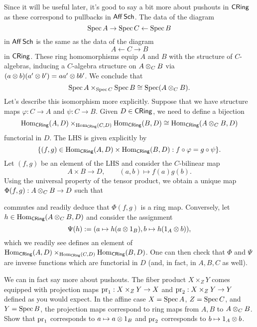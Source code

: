 \documentclass[11pt]{article}
\renewcommand{\phi}{\varphi}
\begin{document}
Since it will be useful later, it's good to say a bit more about pushouts in $\operatorname{\mathsf{CRing}}$ as these correspond to pullbacks in $\operatorname{\mathsf{Aff}}\operatorname{\mathsf{Sch}}$. The data of the diagram 
$$\operatorname{Spec} A\rightarrow\operatorname{Spec} C\leftarrow\operatorname{Spec} B$$
in $\operatorname{\mathsf{Aff}}\operatorname{\mathsf{Sch}}$ is the same as the data of the diagram
$$A\leftarrow C\rightarrow B$$
in $\operatorname{\mathsf{CRing}}$. These ring homomorphisms equip $A$ and $B$ with the structure of $C$-algebras, inducing a $C$-algebra structure on $A\otimes_CB$ via $(a\otimes b)(a'\otimes b')=aa'\otimes bb'$. We conclude that
$$\operatorname{Spec} A\times_{\operatorname{Spec} C}\operatorname{Spec} B\cong\operatorname{Spec}(A\otimes_CB).$$
Let's describe this isomorphism more explicitly. Suppose that we have structure maps $\phi: C\to A$ and $\psi: C\to B$. Given $D\in\operatorname{\mathsf{CRing}}$, we need to define a bijection
$$\operatorname{Hom}_{\operatorname{\mathsf{CRing}}}(A,D)\times_{\operatorname{Hom}_{\operatorname{\mathsf{CRing}}}(C,D)}\operatorname{Hom}_{\operatorname{\mathsf{CRing}}}(B,D)\cong\operatorname{Hom}_{\operatorname{\mathsf{CRing}}}(A\otimes_CB,D)$$
functorial in $D$. The LHS is given explicitly by 
$$\{(f,g)\in\Hom_{\CRing}(A,D)\times\Hom_{\CRing}(B,D) : f\circ\phi=g\circ\psi\}.$$
Let $(f,g)$ be an element of the LHS and consider the $C$-bilinear map 
$$A\times B\to D,\qquad (a,b)\mapsto f(a)g(b).$$
Using the universal property of the tensor product, we obtain a unique map $\Phi(f,g): A\otimes_CB\to D$ such that
\begin{center}
\end{center}
commutes and readily deduce that $\Phi(f,g)$ is a ring map. Conversely, let $h\in\operatorname{Hom}_{\operatorname{\mathsf{CRing}}}(A\otimes_CB,D)$ and consider the assignment
$$\Psi(h):=(a\mapsto h(a\otimes1_B),b\mapsto h(1_A\otimes b)),$$
which we readily see defines an element of $\operatorname{Hom}_{\operatorname{\mathsf{CRing}}}(A,D)\times_{\operatorname{Hom}_{\operatorname{\mathsf{CRing}}}(C,D)}\operatorname{Hom}_{\operatorname{\mathsf{CRing}}}(B,D)$. One can then check that $\Phi$ and $\Psi$ are inverse functions which are functorial in $D$ (and, in fact, in $A,B,C$ as well).

\begin{exercise}
We can in fact say more about pushouts. The fiber product $X\times_ZY$ comes equipped with projection maps $\operatorname{pr}_1: X\times_ZY\to X$ and $\operatorname{pr}_2: X\times_ZY\to Y$ defined as you would expect. In the affine case $X=\operatorname{Spec} A$, $Z=\operatorname{Spec} C$, and $Y=\operatorname{Spec} B$, the projection maps correspond to ring maps from $A,B$ to $A\otimes_CB$. Show that $\operatorname{pr}_1$ corresponds to $a\mapsto a\otimes1_B$ and $\operatorname{pr}_2$ corresponds to $b\mapsto1_A\otimes b$.
\end{exercise}
\end{document}
